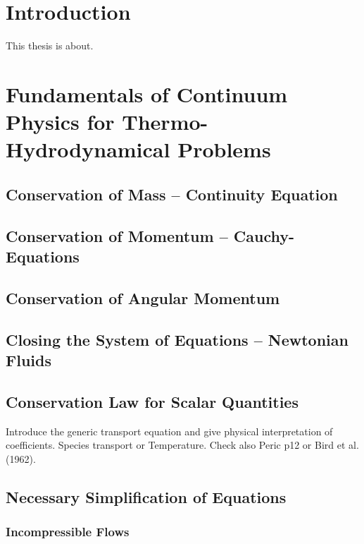 \documentclass[article,type=msc,colorback,accentcolor=tud2a]{tudthesis}
\begin{document}
  \author{Fabian Nuraddin Alexander Gabel}
  \makethesistitle
  \tableofcontents

\printnomenclature
  \section{Introduction}

  This thesis is about. 

  \section{Fundamentals of Continuum Physics for Thermo-Hydrodynamical Problems}

    \subsection{Conservation of Mass -- Continuity Equation}
    \subsection{Conservation of Momentum -- Cauchy-Equations}
    \subsection{Conservation of Angular Momentum}
    \subsection{Closing the System of Equations -- Newtonian Fluids}
    \subsection{Conservation Law for Scalar Quantities}
        Introduce the generic transport equation and give physical interpretation of coefficients. Species transport or Temperature.
        Check also Peric p12 or Bird et al. (1962).
    \subsection{Necessary Simplification of Equations}
      \subsubsection{Incompressible Flows}
\end{document}
